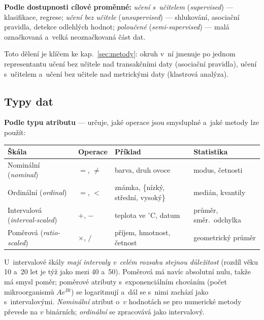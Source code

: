 \documentclass[11pt,a4paper]{article}
\theoremstyle{definition}
\begin{document}
\textbf{Podle dostupnosti cílové proměnné:} \emph{učení s~učitelem} (\emph{supervised}) ---
klasifikace, regrese; \emph{učení bez učitele} (\emph{unsupervised}) --- shlukování,
asociační pravidla, detekce odlehlých hodnot; \emph{poloučené} (\emph{semi-supervised}) ---
malá označkovaná a~velká neoznačkovaná část dat.

Toto dělení je klíčem ke kap.~\ref{sec:metody}: okruh v~ní jmenuje po jednom representantu
učení bez učitele nad transakčními daty (asociační pravidla), učení s~učitelem a~učení bez
učitele nad metrickými daty (klastrová analýza).

\subsection{Typy dat}

\textbf{Podle typu atributu} --- určuje, jaké operace jsou smysluplné a~jaké metody lze
použít:

\begin{center}
\small
\begin{tabular}{@{}p{3.3cm}p{2.2cm}p{5.2cm}p{4.0cm}@{}}
\toprule
\textbf{Škála} & \textbf{Operace} & \textbf{Příklad} & \textbf{Statistika} \\
\midrule
Nominální (\emph{nominal}) & $=$, $\neq$ & barva, druh ovoce & modus, četnosti \\
Ordinální (\emph{ordinal}) & $=$, $<$ & známka, \{nízký, střední, vysoký\} & medián,
  kvantily \\
Intervalová (\emph{interval-scaled}) & $+$, $-$ & teplota ve $^{\circ}$C, datum & průměr,
  směr.\ odchylka \\
Poměrová (\emph{ratio-scaled}) & $\times$, $/$ & příjem, hmotnost, četnost & geometrický
  průměr \\
\bottomrule
\end{tabular}
\end{center}

U~intervalové škály \emph{mají intervaly v~celém rozsahu stejnou důležitost} (rozdíl věku 10
a~20 let je týž jako mezi 40 a~50). Poměrová má navíc absolutní nulu, takže má smysl poměr;
poměrové atributy s~exponenciálním chováním (počet mikroorganismů $Ae^{Bt}$) se logaritmují
a~dál se s~nimi zachází jako s~intervalovými. \emph{Nominální} atribut o~$v$ hodnotách se pro
numerické metody převede na $v$ binárních; \emph{ordinální} se zpracovává jako intervalový.
\end{document}
